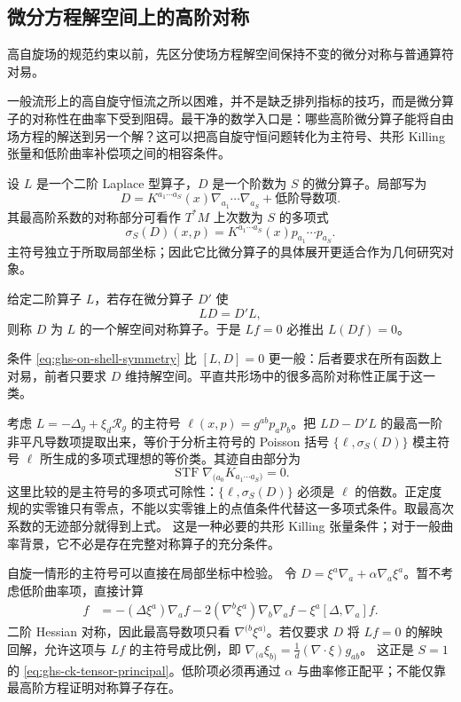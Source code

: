 \subsection{微分方程解空间上的高阶对称}

高自旋场的规范约束以前，先区分使场方程解空间保持不变的微分对称与普通算符对易。

一般流形上的高自旋守恒流之所以困难，并不是缺乏排列指标的技巧，而是微分算子的对称性在曲率下受到阻碍。最干净的数学入口是：哪些高阶微分算子能将自由场方程的解送到另一个解？这可以把高自旋守恒问题转化为主符号、共形 Killing 张量和低阶曲率补偿项之间的相容条件。

设 $L$ 是一个二阶 Laplace 型算子，$D$ 是一个阶数为 $S$ 的微分算子。局部写为
\[
 D=K^{a_1\cdots a_S}(x)\nabla_{a_1}\cdots\nabla_{a_S}
 +\text{低阶导数项}.
\]
其最高阶系数的对称部分可看作 $T^*M$ 上次数为 $S$ 的多项式
\[
 \sigma_S(D)(x,p)=K^{a_1\cdots a_S}(x)p_{a_1}\cdots p_{a_S}.
\]
主符号独立于所取局部坐标；因此它比微分算子的具体展开更适合作为几何研究对象。

\begin{definition}[模场方程的高阶对称算子]
给定二阶算子 $L$，若存在微分算子 $D'$ 使
\begin{equation}\label{eq:ghs-on-shell-symmetry}
 L D=D'L,
\end{equation}
则称 $D$ 为 $L$ 的一个解空间对称算子。于是 $Lf=0$ 必推出 $L(Df)=0$。
\end{definition}

条件 \cref{eq:ghs-on-shell-symmetry} 比 $[L,D]=0$ 更一般：后者要求在所有函数上对易，前者只要求 $D$ 维持解空间。平直共形场中的很多高阶对称性正属于这一类。

考虑 $L=-\Delta_g+\xi_d\mathcal R_g$ 的主符号 $\ell(x,p)=g^{ab}p_ap_b$。把 $LD-D'L$ 的最高一阶非平凡导数项提取出来，等价于分析主符号的 Poisson 括号 $\{\ell,\sigma_S(D)\}$ 模主符号 $\ell$ 所生成的多项式理想的等价类。其迹自由部分为
\begin{equation}\label{eq:ghs-ck-tensor-principal}
 \operatorname{STF}\nabla_{(a_0}K_{a_1\cdots a_S)}=0.
\end{equation}
这里比较的是主符号的多项式可除性：$\{\ell,\sigma_S(D)\}$ 必须是 $\ell$ 的倍数。正定度规的实零锥只有零点，不能以实零锥上的点值条件代替这一多项式条件。取最高次系数的无迹部分就得到上式。
这是一种必要的共形 Killing 张量条件；对于一般曲率背景，它不必是存在完整对称算子的充分条件。

自旋一情形的主符号可以直接在局部坐标中检验。
令 $D=\xi^a\nabla_a+\alpha\nabla_a\xi^a$。暂不考虑低阶曲率项，直接计算
\begin{align*}
[-\Delta,\xi^a\nabla_a]f
&=-(\Delta\xi^a)\nabla_af
 -2(\nabla^b\xi^a)\nabla_b\nabla_af
 -\xi^a[\Delta,\nabla_a]f.
\end{align*}
二阶 Hessian 对称，因此最高导数项只看 $\nabla^{(b}\xi^{a)}$。若仅要求 $D$ 将 $Lf=0$ 的解映回解，允许这项与 $Lf$ 的主符号成比例，即
$\nabla_{(a}\xi_{b)}=\frac1d(\nabla\cdot\xi)g_{ab}$。
这正是 $S=1$ 的 \cref{eq:ghs-ck-tensor-principal}。低阶项必须再通过 $\alpha$ 与曲率修正配平；不能仅靠最高阶方程证明对称算子存在。

